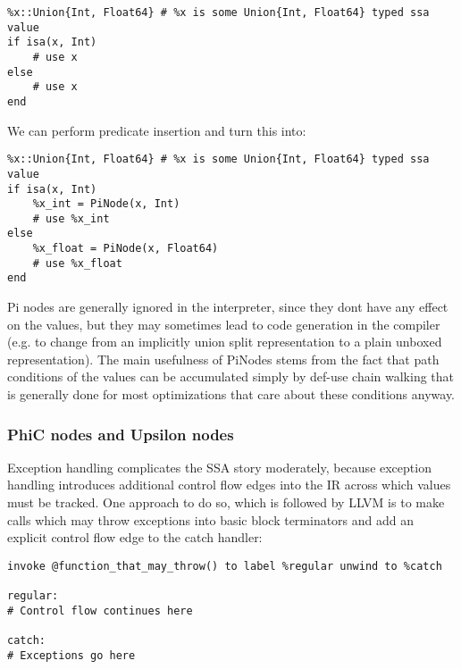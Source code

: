 \begin{verbatim}
%x::Union{Int, Float64} # %x is some Union{Int, Float64} typed ssa value
if isa(x, Int)
    # use x
else
    # use x
end
\end{verbatim}



We can perform predicate insertion and turn this into:




\begin{verbatim}
%x::Union{Int, Float64} # %x is some Union{Int, Float64} typed ssa value
if isa(x, Int)
    %x_int = PiNode(x, Int)
    # use %x_int
else
    %x_float = PiNode(x, Float64)
    # use %x_float
end
\end{verbatim}



Pi nodes are generally ignored in the interpreter, since they don{\textquotesingle}t have any effect on the values, but they may sometimes lead to code generation in the compiler (e.g. to change from an implicitly union split representation to a plain unboxed representation). The main usefulness of PiNodes stems from the fact that path conditions of the values can be accumulated simply by def-use chain walking that is generally done for most optimizations that care about these conditions anyway.



\hypertarget{1498305755051877944}{}


\subsubsection{PhiC nodes and Upsilon nodes}



Exception handling complicates the SSA story moderately, because exception handling introduces additional control flow edges into the IR across which values must be tracked. One approach to do so, which is followed by LLVM is to make calls which may throw exceptions into basic block terminators and add an explicit control flow edge to the catch handler:




\begin{lstlisting}
invoke @function_that_may_throw() to label %regular unwind to %catch

regular:
# Control flow continues here

catch:
# Exceptions go here
\end{lstlisting}



